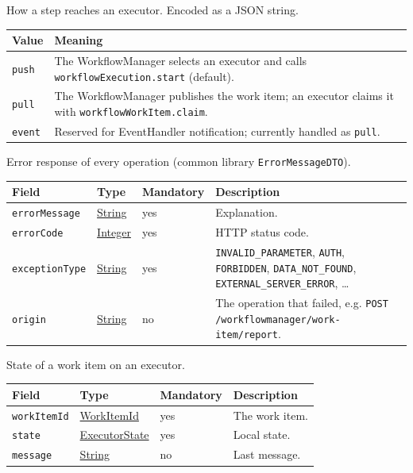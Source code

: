 \documentclass[a4paper]{arrowhead}
\newcommand{\mref}[1]{{\textcolor{ArrowheadPurple}{\hyperref[sec:model:#1]{#1}}}}
\newcommand{\pref}[1]{{\textcolor{ArrowheadGrey}{\hyperref[sec:model:primitives:#1]{#1}}}}
\begin{document}
How a step reaches an executor.
 Encoded as a JSON string.
{\small
\begin{longtable}{|p{3.9cm}|p{11.9cm}|}

\hline
\rowcolor{gray!33} Value & Meaning \\ \hline
\endhead
\texttt{push} & The WorkflowManager selects an executor and calls \texttt{workflow\allowbreak{}Execution.\allowbreak{}start} (default). \\ \hline
\texttt{pull} & The WorkflowManager publishes the work item; an executor claims it with \texttt{workflow\allowbreak{}Work\allowbreak{}Item.\allowbreak{}claim}. \\ \hline
\texttt{event} & Reserved for EventHandler notification; currently handled as \texttt{pull}. \\ \hline
\end{longtable}
}

Error response of every operation (common library \texttt{Error\allowbreak{}MessageDTO}).

{\small
\begin{longtable}{|p{3.7cm}|p{4.2cm}|p{1.6cm}|p{6.3cm}|}

\hline
\rowcolor{gray!33} Field & Type & Mandatory & Description \\ \hline
\endhead
\texttt{errorMessage} & \pref{String} & yes & Explanation. \\ \hline
\texttt{errorCode} & \pref{Integer} & yes & HTTP status code. \\ \hline
\texttt{exceptionType} & \pref{String} & yes & \texttt{INVALID\_\allowbreak{}PARAMETER}, \texttt{AUTH}, \texttt{FORBIDDEN}, \texttt{DATA\_\allowbreak{}NOT\_\allowbreak{}FOUND}, \texttt{EXTERNAL\_\allowbreak{}SERVER\_\allowbreak{}ERROR}, \ldots \\ \hline
\texttt{origin} & \pref{String} & no & The operation that failed, e.g. \texttt{POST /\allowbreak{}workflowmanager/\allowbreak{}work-\allowbreak{}item/\allowbreak{}report}. \\ \hline
\end{longtable}
}

State of a work item on an executor.

{\small
\begin{longtable}{|p{3.7cm}|p{4.2cm}|p{1.6cm}|p{6.3cm}|}

\hline
\rowcolor{gray!33} Field & Type & Mandatory & Description \\ \hline
\endhead
\texttt{workItemId} & \pref{WorkItemId} & yes & The work item. \\ \hline
\texttt{state} & \mref{ExecutorState} & yes & Local state. \\ \hline
\texttt{message} & \pref{String} & no & Last message. \\ \hline
\end{longtable}
}
\end{document}
